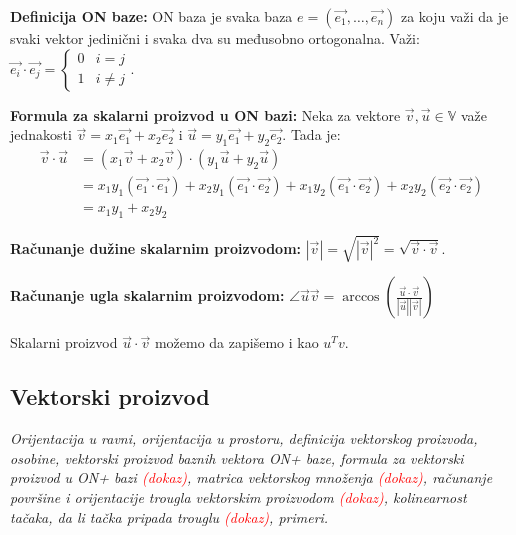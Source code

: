\documentclass[12pt]{article}
\newcommand{\vek}[1]{\overrightarrow{#1}}
\newcommand{\ocena}[1]{\textcolor{red}{#1}}
\begin{document}
\textbf{Definicija ON baze:} ON baza je svaka baza $e=(\vek{e_1},\dotsc,
    \vek{e_n})$ za koju važi da je svaki vektor jedinični i svaka dva su
međusobno ortogonalna. Važi: $\vek{e_i}\cdot\vek{e_j} =
    \begin{cases}
        0 & i=j     \\
        1 & i\neq j
    \end{cases}$.
\par

\textbf{Formula za skalarni proizvod u ON bazi:} Neka za vektore $\vek{v},
    \vek{u}\in\mathbb{V}$ važe jednakosti $\vek{v}=x_1\vek{e_1}+x_2\vek{e_2}$ i
$\vek{u}=y_1\vek{e_1}+y_2\vek{e_2}$. Tada je:
\begin{align*}
    \vek{v}\cdot\vek{u} & = (x_1\vek{v}+x_2\vek{v})\cdot(y_1\vek{u}
    +y_2\vek{u})                                                             \\
                        & = x_1y_1(\vek{e_1}\cdot\vek{e_1})+x_2y_1(\vek{e_1}
    \cdot\vek{e_2})+x_1y_2(\vek{e_1}\cdot\vek{e_2})+x_2y_2(\vek{e_2}
    \cdot\vek{e_2})                                                          \\
                        & = x_1y_1+x_2y_2
\end{align*}
\par

\textbf{Računanje dužine skalarnim proizvodom:} $|\vek{v}|=\sqrt{|\vek{v}|^2}=
    \sqrt{\vek{v}\cdot\vek{v}}$.
\par

\textbf{Računanje ugla skalarnim proizvodom:} $\angle{\vek{u}\vek{v}}=
    \arccos(\frac{\vek{u}\cdot\vek{v}}{|\vek{u}||\vek{v}|})$
\par

Skalarni proizvod $\vek{u}\cdot\vek{v}$ možemo da zapišemo i kao $u^Tv$.
\par

\subsection{Vektorski proizvod}
\textit{Orijentacija u ravni, orijentacija u prostoru, definicija vektorskog
    proizvoda, osobine, vektorski proizvod baznih vektora ON+ baze, formula za
    vektorski proizvod u ON+ bazi \ocena{(dokaz)}, matrica vektorskog množenja \ocena{(dokaz)},
    računanje površine i orijentacije trougla vektorskim proizvodom \ocena{(dokaz)},
    kolinearnost tačaka, da li tačka pripada trouglu \ocena{(dokaz)}, primeri.}
\par
\vspace*{1cm}
\end{document}
